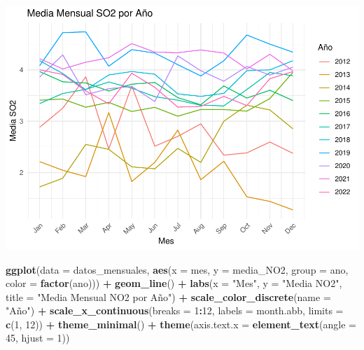 \documentclass[notspecified,article,submit,moreauthors,pdftex]{Definitions/mdpi}
\newenvironment{Shaded}{\begin{snugshade}}{\end{snugshade}}
\newcommand{\AttributeTok}[1]{\textcolor[rgb]{0.13,0.29,0.53}{#1}}
\newcommand{\DecValTok}[1]{\textcolor[rgb]{0.00,0.00,0.81}{#1}}
\newcommand{\FunctionTok}[1]{\textcolor[rgb]{0.13,0.29,0.53}{\textbf{#1}}}
\newcommand{\NormalTok}[1]{#1}
\newcommand{\SpecialCharTok}[1]{\textcolor[rgb]{0.81,0.36,0.00}{\textbf{#1}}}
\newcommand{\StringTok}[1]{\textcolor[rgb]{0.31,0.60,0.02}{#1}}
\begin{document}
\includegraphics{ProyectoAED2023_plantilla_files/figure-latex/unnamed-chunk-27-1.pdf}

\begin{Shaded}
\begin{Highlighting}[]
\FunctionTok{ggplot}\NormalTok{(}\AttributeTok{data =}\NormalTok{ datos\_mensuales, }\FunctionTok{aes}\NormalTok{(}\AttributeTok{x =}\NormalTok{ mes, }\AttributeTok{y =}\NormalTok{ media\_NO2, }\AttributeTok{group =}\NormalTok{ ano, }\AttributeTok{color =} \FunctionTok{factor}\NormalTok{(ano))) }\SpecialCharTok{+}
  \FunctionTok{geom\_line}\NormalTok{() }\SpecialCharTok{+}
  \FunctionTok{labs}\NormalTok{(}\AttributeTok{x =} \StringTok{"Mes"}\NormalTok{, }\AttributeTok{y =} \StringTok{"Media NO2"}\NormalTok{, }\AttributeTok{title =} \StringTok{"Media Mensual NO2 por Año"}\NormalTok{) }\SpecialCharTok{+}
  \FunctionTok{scale\_color\_discrete}\NormalTok{(}\AttributeTok{name =} \StringTok{"Año"}\NormalTok{) }\SpecialCharTok{+}
  \FunctionTok{scale\_x\_continuous}\NormalTok{(}\AttributeTok{breaks =} \DecValTok{1}\SpecialCharTok{:}\DecValTok{12}\NormalTok{, }\AttributeTok{labels =}\NormalTok{ month.abb, }\AttributeTok{limits =} \FunctionTok{c}\NormalTok{(}\DecValTok{1}\NormalTok{, }\DecValTok{12}\NormalTok{)) }\SpecialCharTok{+}
  \FunctionTok{theme\_minimal}\NormalTok{() }\SpecialCharTok{+}
  \FunctionTok{theme}\NormalTok{(}\AttributeTok{axis.text.x =} \FunctionTok{element\_text}\NormalTok{(}\AttributeTok{angle =} \DecValTok{45}\NormalTok{, }\AttributeTok{hjust =} \DecValTok{1}\NormalTok{))}
\end{Highlighting}
\end{Shaded}
\end{document}
